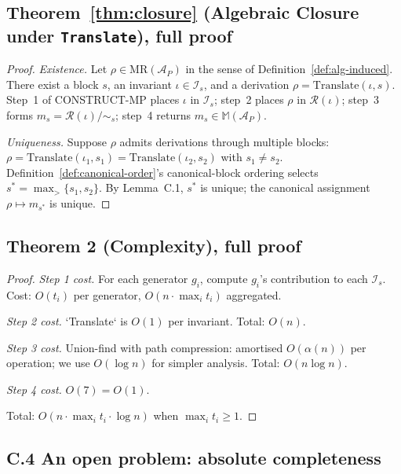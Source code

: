 \documentclass[manuscript]{acmart}
\begin{document}
\subsection*{Theorem~\ref{thm:closure} (Algebraic Closure under \texttt{Translate}), full proof}

\begin{proof}
\emph{Existence.} Let $\rho \in \mathrm{MR}(\mathcal{A}_P)$ in the sense of Definition~\ref{def:alg-induced}. There exist a block $s$, an invariant $\iota \in \mathcal{I}_s$, and a derivation $\rho = \mathrm{Translate}(\iota, s)$. Step~1 of CONSTRUCT-MP places $\iota$ in $\mathcal{I}_s$; step~2 places $\rho$ in $\mathcal{R}(\iota)$; step~3 forms $m_s = \mathcal{R}(\iota)/\!\sim_s$; step~4 returns $m_s \in \mathbb{M}(\mathcal{A}_P)$.

\emph{Uniqueness.} Suppose $\rho$ admits derivations through multiple blocks: $\rho = \mathrm{Translate}(\iota_1, s_1) = \mathrm{Translate}(\iota_2, s_2)$ with $s_1 \neq s_2$. Definition~\ref{def:canonical-order}'s canonical-block ordering selects $s^{*} = \max_{>}\{s_1, s_2\}$. By Lemma~C.1, $s^{*}$ is unique; the canonical assignment $\rho \mapsto m_{s^{*}}$ is unique.
\end{proof}

\subsection*{Theorem 2 (Complexity), full proof}

\begin{proof}
\emph{Step 1 cost.} For each generator $g_i$, compute $g_i$'s contribution to each $\mathcal{I}_s$. Cost: $O(t_i)$ per generator, $O(n \cdot \max_i t_i)$ aggregated.

\emph{Step 2 cost.} `Translate` is $O(1)$ per invariant. Total: $O(n)$.

\emph{Step 3 cost.} Union-find with path compression: amortised $O(\alpha(n))$ per operation; we use $O(\log n)$ for simpler analysis. Total: $O(n \log n)$.

\emph{Step 4 cost.} $O(7) = O(1)$.

Total: $O(n \cdot \max_i t_i \cdot \log n)$ when $\max_i t_i \ge 1$.
\end{proof}

\subsection*{C.4 An open problem: absolute completeness}
\end{document}
